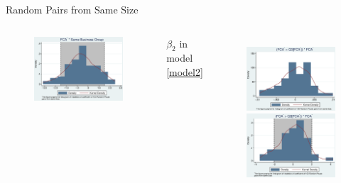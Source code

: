 \documentclass{beamer}
\begin{document}
\begin{frame}{Random Pairs from Same Size}
\begin{columns}
\begin{figure}
				\includegraphics[width=\linewidth]{SizePseudoSBFCA_t.eps}
			\end{figure}
			\begin{center}
				$ \beta_2 $ in model \ref{model2}
			\end{center}
			\begin{figure}
				\centering
				\includegraphics[width=\linewidth]{SizePseudoMNMFCA.eps}\\
				\includegraphics[width=\linewidth]{SizePseudoMNMFCA_t.eps}

\end{figure}
\end{columns}
\end{frame}
\end{document}

